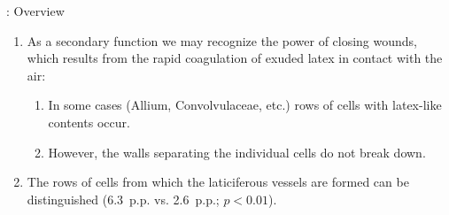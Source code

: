 \begin{frame}{\titleprefix: Overview}

	\begin{enumerate}
		\item<1-> As a secondary function we may recognize the power of closing wounds, which results from the rapid coagulation of exuded latex in contact with the air:
		\begin{enumerate}
			\item<2-> In some cases (Allium, Convolvulaceae, etc.) rows of cells with latex-like contents occur.
			\item<2-> However, the walls separating the individual cells do not break down.
		\end{enumerate}
		\item<3-> The rows of cells from which the laticiferous vessels are formed can be distinguished (6.3~p.p. vs. 2.6~p.p.; ${p < 0.01}$).
	\end{enumerate}

\end{frame}



